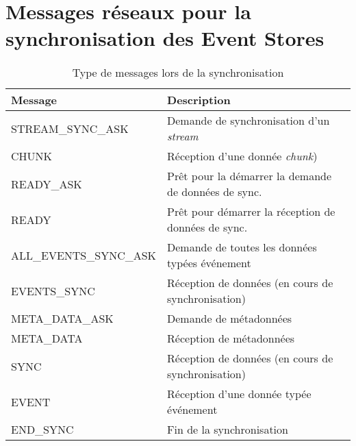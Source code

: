 \section{Messages réseaux pour la synchronisation des Event Stores}
\label{annexe:protocole}
\begin{table}[h]
	\centering
	\small
	\caption{Type de messages lors de la synchronisation}
	\label{table:messagetype}
	\begin{tabular}{ll}
		\toprule
		\textbf{Message}                & \textbf{Description} \\ \hline
		STREAM\_SYNC\_ASK      &  Demande de synchronisation d'un 
		\textit{stream}           \\
		CHUNK                  &     Réception d'une donnée \textit{chunk})        
		\\
		READY\_ASK             &      Prêt pour la démarrer la demande de 
		données de 
		sync.        \\
		READY                  &       Prêt pour démarrer la réception de 
		données de 
		sync.      \\
		ALL\_EVENTS\_SYNC\_ASK &     Demande de toutes les données 
		typées 
		événement           \\
		EVENTS\_SYNC           &        Réception de données (en cours de 
		synchronisation)       \\
		META\_DATA\_ASK        &     Demande de métadonnées       \\
		META\_DATA             &      Réception de métadonnées       \\
		SYNC                   &      Réception de données (en cours de 
		synchronisation)         \\
		EVENT                  &     Réception d'une donnée typée 
		événement        \\
		END\_SYNC              & Fin de la synchronisation \\ \bottomrule
	\end{tabular}
\end{table}


